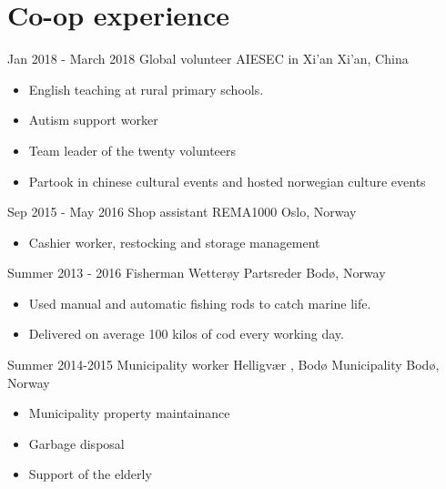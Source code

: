 \documentclass[10pt, letterpaper]{moderncv}
\begin{document}
\section{Co-op experience}
    \begin{samepage}
      \cventry
          {Jan 2018 - March 2018}
          {Global volunteer}
          {%
%
AIESEC in Xi'an%
}
          {Xi'an, China}
        {}
        {
            \begin{itemize}
                \item{English teaching at rural primary schools.}
                \item{Autism support worker}
                \item{Team leader of the twenty volunteers}
                \item{Partook in chinese cultural events and hosted norwegian culture events}
            \end{itemize}
        }
    \end{samepage}
    \begin{samepage}
      \cventry
          {Sep 2015 - May 2016}
          {Shop assistant}
          {%
%
REMA1000%
}
          {Oslo, Norway}
        {}
        {
            \begin{itemize}
                \item{Cashier worker, restocking and storage management}
            \end{itemize}
        }
    \end{samepage}
    \begin{samepage}
      \cventry
          {Summer 2013 - 2016}
          {Fisherman}
          {%
%
Wetterøy Partsreder%
}
          {Bodø, Norway}
        {}
        {
            \begin{itemize}
                \item{Used manual and automatic fishing rods to catch marine life.}
                \item{Delivered on average 100 kilos of cod every working day.}
            \end{itemize}
        }
    \end{samepage}
    \begin{samepage}
      \cventry
          {Summer 2014-2015}
          {Municipality worker}
          {%
Helligvær
, %
Bodø Municipality%
}
          {Bodø, Norway}
        {}
        {
            \begin{itemize}
                \item{Municipality property maintainance}
                \item{Garbage disposal}
                \item{Support of the elderly}
            \end{itemize}
        }
    \end{samepage}
\end{document}
